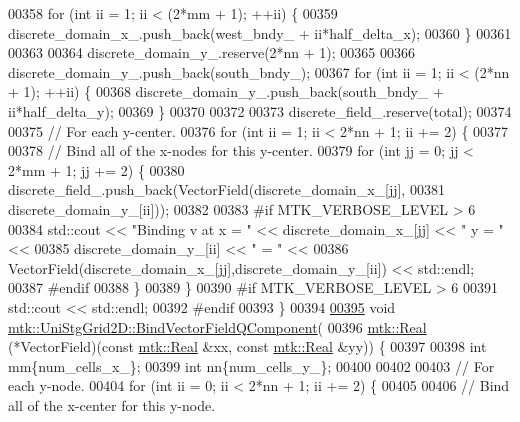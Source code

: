 \begin{DoxyCode}
00358   \textcolor{keywordflow}{for} (\textcolor{keywordtype}{int} ii = 1; ii < (2*mm + 1); ++ii) \{
00359     discrete\_domain\_x\_.push\_back(west\_bndy\_ + ii*half\_delta\_x);
00360   \}
00361 
00363 
00364   discrete\_domain\_y\_.reserve(2*nn + 1);
00365 
00366   discrete\_domain\_y\_.push\_back(south\_bndy\_);
00367   \textcolor{keywordflow}{for} (\textcolor{keywordtype}{int} ii = 1; ii < (2*nn + 1); ++ii) \{
00368     discrete\_domain\_y\_.push\_back(south\_bndy\_ + ii*half\_delta\_y);
00369   \}
00370 
00372 
00373   discrete\_field\_.reserve(total);
00374 
00375   \textcolor{comment}{// For each y-center.}
00376   \textcolor{keywordflow}{for} (\textcolor{keywordtype}{int} ii = 1; ii < 2*nn + 1; ii += 2) \{
00377 
00378     \textcolor{comment}{// Bind all of the x-nodes for this y-center.}
00379     \textcolor{keywordflow}{for} (\textcolor{keywordtype}{int} jj = 0; jj < 2*mm + 1; jj += 2) \{
00380       discrete\_field\_.push\_back(VectorField(discrete\_domain\_x\_[jj],
00381                                             discrete\_domain\_y\_[ii]));
00382 
00383 \textcolor{preprocessor}{      #if MTK\_VERBOSE\_LEVEL > 6}
00384       std::cout << \textcolor{stringliteral}{"Binding v at x = "} << discrete\_domain\_x\_[jj] << \textcolor{stringliteral}{" y = "} <<
00385         discrete\_domain\_y\_[ii] << \textcolor{stringliteral}{" = "} <<
00386         VectorField(discrete\_domain\_x\_[jj],discrete\_domain\_y\_[ii]) << std::endl;
00387 \textcolor{preprocessor}{      #endif}
00388     \}
00389   \}
00390 \textcolor{preprocessor}{  #if MTK\_VERBOSE\_LEVEL > 6}
00391   std::cout << std::endl;
00392 \textcolor{preprocessor}{  #endif}
00393 \}
00394 
\hypertarget{mtk__uni__stg__grid__2d_8cc_source_l00395}{}\hyperlink{classmtk_1_1UniStgGrid2D_a9643167e149da2ea4e57fd12cb9f1a97}{00395} \textcolor{keywordtype}{void} \hyperlink{classmtk_1_1UniStgGrid2D_a9643167e149da2ea4e57fd12cb9f1a97}{mtk::UniStgGrid2D::BindVectorFieldQComponent}(
00396   \hyperlink{group__c01-roots_gac080bbbf5cbb5502c9f00405f894857d}{mtk::Real} (*VectorField)(\textcolor{keyword}{const} \hyperlink{group__c01-roots_gac080bbbf5cbb5502c9f00405f894857d}{mtk::Real} &xx, \textcolor{keyword}{const} 
      \hyperlink{group__c01-roots_gac080bbbf5cbb5502c9f00405f894857d}{mtk::Real} &yy)) \{
00397 
00398   \textcolor{keywordtype}{int} mm\{num\_cells\_x\_\};
00399   \textcolor{keywordtype}{int} nn\{num\_cells\_y\_\};
00400 
00402 
00403   \textcolor{comment}{// For each y-node.}
00404   \textcolor{keywordflow}{for} (\textcolor{keywordtype}{int} ii = 0; ii < 2*nn + 1; ii += 2) \{
00405 
00406     \textcolor{comment}{// Bind all of the x-center for this y-node.}

\end{DoxyCode}

